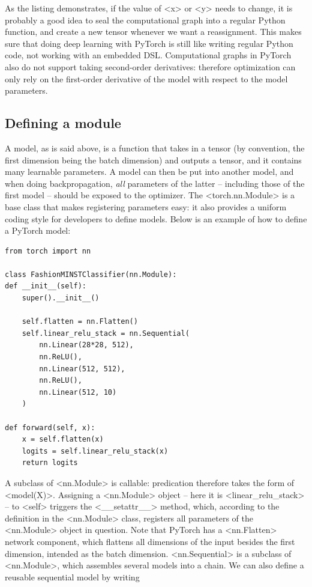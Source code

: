 \documentclass[hyperref, a4paper, 12pt]{report}
\def\texttt#1{<#1>}%
\newcommand{\shortcode}[1]{\texttt{#1}}
\begin{document}
As the listing demonstrates, if the value of \shortcode{x} or \shortcode{y} needs to change,
it is probably a good idea to seal the computational graph into a regular Python function,
and create a new tensor whenever we want a reassignment.
This makes sure that doing deep learning with PyTorch is still like writing regular Python code,
not working with an embedded DSL.
Computational graphs in PyTorch also do not support taking second-order derivatives:
therefore optimization can only rely on the first-order derivative of the model with respect to the model parameters.

\subsection{Defining a module}
A model, as is said above, is a function that takes in a tensor (by convention, the first dimension being the batch dimension) and outputs a tensor,
and it contains many learnable parameters.
A model can then be put into another model,
and when doing backpropagation,
\emph{all} parameters of the latter -- including those of the first model -- 
should be exposed to the optimizer.
The \shortcode{torch.nn.Module} is a base class that makes registering parameters easy:
it also provides a uniform coding style for developers to define models.
Below is an example of how to define a PyTorch model:

\begin{lstlisting}
from torch import nn 

class FashionMINSTClassifier(nn.Module):
def __init__(self):
    super().__init__()
    
    self.flatten = nn.Flatten()
    self.linear_relu_stack = nn.Sequential(
        nn.Linear(28*28, 512),
        nn.ReLU(),
        nn.Linear(512, 512),
        nn.ReLU(),
        nn.Linear(512, 10)
    )
    
def forward(self, x):
    x = self.flatten(x)
    logits = self.linear_relu_stack(x)
    return logits
\end{lstlisting}

A subclass of \shortcode{nn.Module} is callable:
predication therefore takes the form of \shortcode{model(X)}.
Assigning a \shortcode{nn.Module} object -- here it is \shortcode{linear_relu_stack} -- to \shortcode{self} triggers the \shortcode{__setattr__} method,
which, according to the definition in the \shortcode{nn.Module} class,
registers all parameters of the \shortcode{nn.Module} object in question.
Note that PyTorch has a \shortcode{nn.Flatten} network component,
which flattens all dimensions of the input besides the first dimension,
intended as the batch dimension.
\shortcode{nn.Sequential} is a subclass of \shortcode{nn.Module},
which assembles several models into a chain.
We can also define a reusable sequential model by writing
\end{document}

